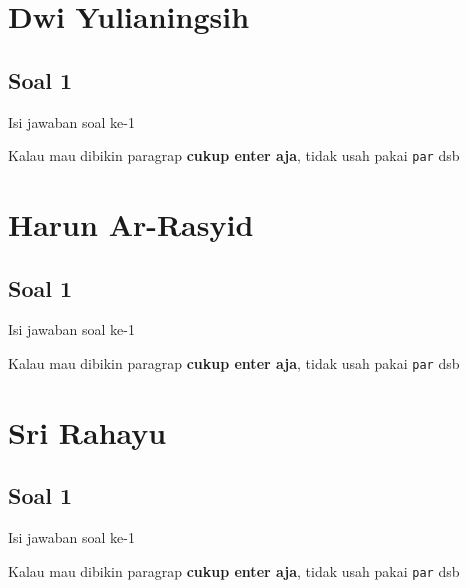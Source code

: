 \section{Dwi Yulianingsih}
\subsection{Soal 1}
Isi jawaban soal ke-1

Kalau mau dibikin paragrap \textbf{cukup enter aja}, tidak usah pakai \verb|par| dsb



\section{Harun Ar-Rasyid}
\subsection{Soal 1}
Isi jawaban soal ke-1

Kalau mau dibikin paragrap \textbf{cukup enter aja}, tidak usah pakai \verb|par| dsb



\section{Sri Rahayu}
\subsection{Soal 1}
Isi jawaban soal ke-1

Kalau mau dibikin paragrap \textbf{cukup enter aja}, tidak usah pakai \verb|par| dsb

